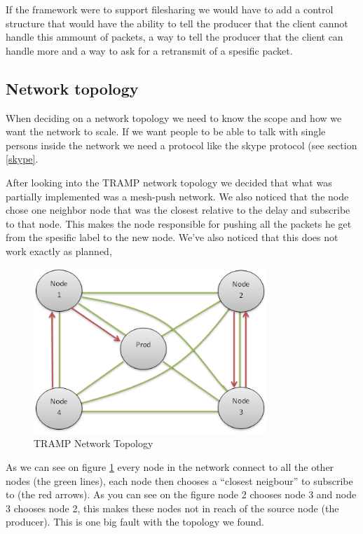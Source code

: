 If the framework were to support filesharing we would have to add a control structure that would have the ability to tell the producer that the client cannot handle this ammount of packets, a way to tell the producer that the client can handle more and a way to ask for a retransmit of a spesific packet.

\subsection{Network topology}
When deciding on a network topology we need to know the scope and how we want the network to scale. If we want people to be able to talk with single persons inside the network we need a protocol like the skype protocol (see section \ref{skype}.

After looking into the TRAMP network topology we decided that what was partially implemented was a mesh-push network. We also noticed that the node chose one neighbor node that was the closest relative to the delay and subscribe to that node. This makes the node responsible for pushing all the packets he get from the spesific label to the new node. We've also noticed that this does not work exactly as planned, 

\begin{center}
 \begin{figure}[h!]
  \includegraphics[width=250pt]{TrampNetworkTopology.png}
  \caption{TRAMP Network Topology}
  \label{tramp_topology}
 \end{figure}
\end{center}

As we can see on figure \ref{tramp_topology} every node in the network connect to all the other nodes (the green lines), each node then chooses a ``closest neigbour'' to subscribe to (the red arrows). As you can see on the figure node 2 chooses node 3 and node 3 chooses node 2, this makes these nodes not in reach of the source node (the producer). This is one big fault with the topology we found.

